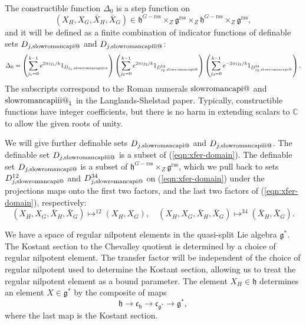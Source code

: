 \documentclass[12pt]{amsart}
\makeatletter
\newcommand*{\rom}[1]{\text{\expandafter\@slowromancap\romannumeral #1@}}
\newcommand{\ring}[1]{{\mathbb #1}}
\newcommand{\fg}{\mathfrak{g}}
\newcommand{\fc}{\mathfrak{c}}
\newcommand{\fh}{\mathfrak{h}}
\newcommand{\reg}{\mathrm{rss}}
\theoremstyle{plain}
\theoremstyle{definition}
\makeatother
\begin{document}
The constructible function $\Delta_0$ is a step function on 
\begin{equation}\label{eqn:xfer-domain}
(X_H,X_G,\bar X_H,\bar X_G)\in 
\fh^{G-\reg}\times_Z\fg^\reg\times_Z \fh^{G-\reg}\times_Z\fg^\reg,
\end{equation}
and it will
be defined as a finite combination of indicator functions of
definable sets $D_{j,{\rom{1}}}$ and $D_{j,\rom{3}}$:
\[
\Delta_0 = \left(\sum_{j_1=0}^{k-1} e^{2\pi i j_1/k} 1_{D_{j_1,{\rom{3}}}}\right)
\left(\sum_{j_2=0}^{k-1} e^{2\pi i j_2/k} 1_{D^{12}_{j_2,{\rom{1}}}}\right)
\left(\sum_{j_3=0}^{k-1} e^{-2\pi i j_3/k} 1_{D^{34}_{j_3,{\rom{1}}}}\right).
\]
The
subscripts
correspond to the Roman numerals $\rom1$ and $\rom3_1$ in the
Langlands-Shelstad paper.
Typically, constructible functions have integer
coefficients, but there is no harm in extending scalars to $\ring{C}$
to allow the given roots of unity.

We will give further definable sets $D_{j,{\rom{1}}}$ and $D_{j,\rom{3}}$. 
The definable set $D_{j,\rom{3}}$ is a subset of (\ref{eqn:xfer-domain}).
The definable set $D_{j,\rom{1}}$ is a subset of $\fh^{G-\reg}\times_Z\fg^\reg$, which we pull back
to sets $D^{12}_{j,\rom1}$ and $D^{34}_{j,\rom1}$ on (\ref{eqn:xfer-domain}) under the projections maps
onto the first two factors, and the last two factors of (\ref{eqn:xfer-domain}), respectively:
\[
(X_H,X_G,\bar X_H,\bar X_G)\mapsto^{12} (X_H,X_G),\quad
(X_H,X_G,\bar X_H,\bar X_G)\mapsto^{34} (\bar X_H,\bar X_G).
\]



We have a space of regular nilpotent elements in the quasi-split Lie
algebra $\fg^*$.  The Kostant section \cite{Kott} to the Chevalley
quotient is determined by a choice of regular nilpotent element.  The
transfer factor will be independent of the choice of regular nilpotent
used to determine the Kostant section, allowing us to treat the
regular nilpotent element as a bound parameter.  The element $X_H\in
\fh$ determines an element $X\in \fg^*$ by the composite of maps
\[
\fh \to \fc_{\fh} \to \fc_{\fg^*} \to \fg^*,
\]
where the last map is the Kostant section.  
\end{document}
